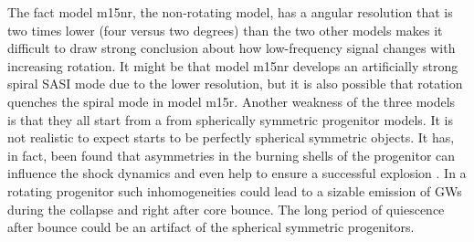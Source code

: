 The fact model m15nr, the non-rotating model, has a angular resolution that is two times lower
(four versus two degrees) than the two other models makes it difficult to draw strong conclusion 
about how low-frequency signal changes with increasing rotation. It might be that model m15nr
develops an artificially strong spiral SASI mode due to the lower resolution, but it is also 
possible that rotation quenches the spiral mode in model m15r. Another weakness of the three
models is that they all start from a from spherically symmetric progenitor models. It is 
not realistic to expect starts to be perfectly spherical symmetric objects.
It has, in fact, been found that asymmetries in the burning shells of the progenitor can 
influence the shock dynamics and even help to ensure a
successful explosion \citep{burrows_96,fryer_04,arnett_11,couch_13,mueller_15a}. In 
a rotating progenitor such inhomogeneities could lead to a sizable emission of GWs
during the collapse and right after core bounce. The long period of quiescence 
after bounce could be an artifact of the spherical symmetric progenitors.





